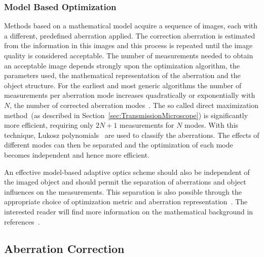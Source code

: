 \subsubsection{Model Based Optimization}
\label{sec:ModelBasedSensing}

Methods based on a mathematical model acquire a sequence of images, each with a different, predefined aberration applied. The correction aberration is estimated from the information in this images and this process is repeated until the image quality is considered acceptable. The number of measurements needed to obtain an acceptable image depends strongly upon the optimization algorithm, the parameters used, the mathematical representation of the aberration and the object structure. For the earliest and most generic algorithms the number of measurements per aberration mode increases quadratically or exponentially with $N$, the number of corrected aberration modes~\cite{wide_sphere_packing}. The so called direct maximization method~(as described in Section~\ref{sec:TransmissionMicroscope}) is significantly more efficient, requiring only $2N+1$ measurements for $N$ modes. With this technique, Lukosz polynomials~\cite{wide_Lukosz_Modes} are used to classify the aberrations. The effects of different modes can then be separated and the optimization of each mode becomes independent and hence more efficient.

An effective model-based adaptive optics scheme should also be independent of the imaged object and should permit the separation of aberrations and object influences on the measurements. This separation is also possible through the appropriate choice of optimization metric and aberration representation~\cite{wide_AOM_loew_freq}. The interested reader will find more information on the mathematical background in references~\cite{wide_AOM_loew_freq, wide_sphere_packing, wide_Lukosz_Modes,wide_parabolic_optimization}. 


\subsection{Aberration Correction}
\label{sec:AberrationCorrection}

